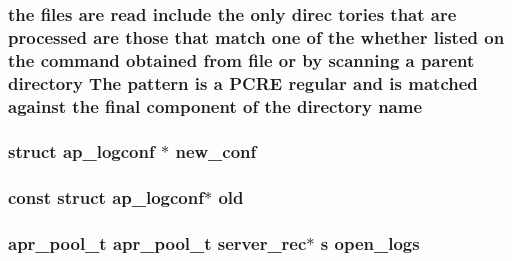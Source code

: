 \subsubsection[{\texorpdfstring{name}{name}}]{ the {\bf files} {\bf are} {\bf read} {\bf include} the only direc tories that {\bf are} processed {\bf are} those that {\bf match} one {\bf of} the whether listed {\bf on} the {\bf command} obtained {\bf from} {\bf file} {\bf or} by {\bf scanning} {\bf a} {\bf parent} {\bf directory} The {\bf pattern} {\bf is} {\bf a} {\bf P\+C\+RE} regular and {\bf is} {\bf matched} against the final {\bf component} {\bf of} the {\bf directory} name}\hypertarget{group__APACHE__CORE__CONFIG_ga06e97fb366205b8f170da3c7562a8677}{}\label{group__APACHE__CORE__CONFIG_ga06e97fb366205b8f170da3c7562a8677}
\subsubsection[{\texorpdfstring{new\+\_\+conf}{new_conf}}]{\setlength{\rightskip}{0pt plus 5cm}struct {\bf ap\+\_\+logconf} $\ast$ new\+\_\+conf}\hypertarget{group__APACHE__CORE__CONFIG_gaceda73e293d0957789ffb6b971897fe6}{}\label{group__APACHE__CORE__CONFIG_gaceda73e293d0957789ffb6b971897fe6}
\subsubsection[{\texorpdfstring{old}{old}}]{\setlength{\rightskip}{0pt plus 5cm}const struct {\bf ap\+\_\+logconf}$\ast$ old}\hypertarget{group__APACHE__CORE__CONFIG_gad4a381169ca3769e4a31a6fdca479660}{}\label{group__APACHE__CORE__CONFIG_gad4a381169ca3769e4a31a6fdca479660}
\subsubsection[{\texorpdfstring{open\+\_\+logs}{open_logs}}]{ {\bf apr\+\_\+pool\+\_\+t} {\bf apr\+\_\+pool\+\_\+t} {\bf server\+\_\+rec}$\ast$ {\bf s} open\+\_\+logs}\hypertarget{group__APACHE__CORE__CONFIG_ga359f9fab9173aa2134d5bc733b9b5809}{}\label{group__APACHE__CORE__CONFIG_ga359f9fab9173aa2134d5bc733b9b5809}
